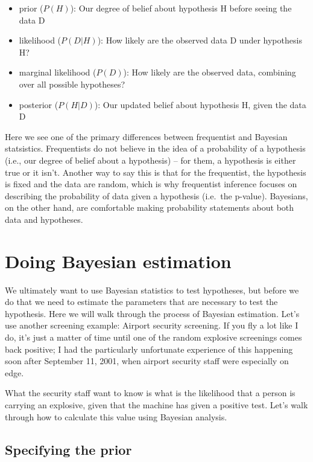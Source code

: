 \documentclass[]{book}
\providecommand{\tightlist}{%
  \setlength{\itemsep}{0pt}\setlength{\parskip}{0pt}}
\theoremstyle{definition}
\theoremstyle{definition}
\theoremstyle{definition}
\theoremstyle{remark}
\begin{document}
\begin{itemize}
\tightlist
\item
  prior (\(P(H)\)): Our degree of belief about hypothesis H before
  seeing the data D
\item
  likelihood (\(P(D|H)\)): How likely are the observed data D under
  hypothesis H?
\item
  marginal likelihood (\(P(D)\)): How likely are the observed data,
  combining over all possible hypotheses?
\item
  posterior (\(P(H|D)\)): Our updated belief about hypothesis H, given
  the data D
\end{itemize}

Here we see one of the primary differences between frequentist and
Bayesian statsistics. Frequentists do not believe in the idea of a
probability of a hypothesis (i.e., our degree of belief about a
hypothesis) -- for them, a hypothesis is either true or it isn't.
Another way to say this is that for the frequentist, the hypothesis is
fixed and the data are random, which is why frequentist inference
focuses on describing the probability of data given a hypothesis
(i.e.~the p-value). Bayesians, on the other hand, are comfortable making
probability statements about both data and hypotheses.

\section{Doing Bayesian estimation}\label{doing-bayesian-estimation}

We ultimately want to use Bayesian statistics to test hypotheses, but
before we do that we need to estimate the parameters that are necessary
to test the hypothesis. Here we will walk through the process of
Bayesian estimation. Let's use another screening example: Airport
security screening. If you fly a lot like I do, it's just a matter of
time until one of the random explosive screenings comes back positive; I
had the particularly unfortunate experience of this happening soon after
September 11, 2001, when airport security staff were especially on edge.

What the security staff want to know is what is the likelihood that a
person is carrying an explosive, given that the machine has given a
positive test. Let's walk through how to calculate this value using
Bayesian analysis.

\subsection{Specifying the prior}\label{specifying-the-prior}
\end{document}
